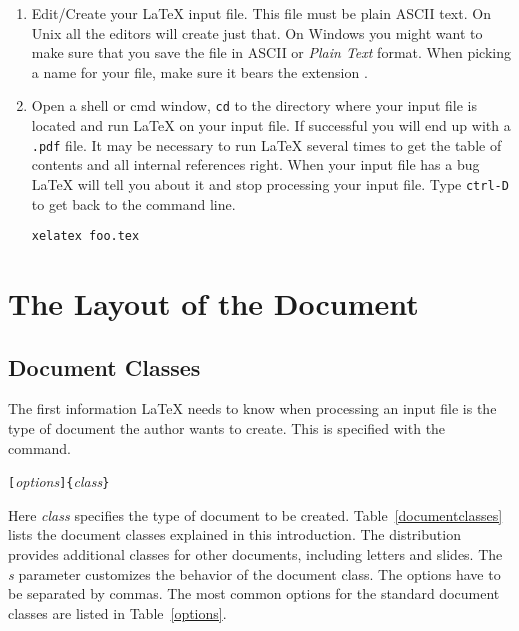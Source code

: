 \begin{enumerate}
\item

  Edit/Create your \LaTeX{} input file. This file must be plain ASCII
  text.  On Unix all the editors will create just that. On Windows you
  might want to make sure that you save the file in ASCII or
  \emph{Plain Text} format.  When picking a name for your file, make
  sure it bears the extension .

\item

Open a shell or cmd window, \texttt{cd} to the directory where your input file is located and run \LaTeX{} on your input file. If successful you will end up with a
\texttt{.pdf} file. It may be necessary to run \LaTeX{} several times to get
the table of contents and all internal references right. When your input
file has a bug \LaTeX{} will tell you about it and stop processing your
input file. Type \texttt{ctrl-D} to get back to the command line.
\begin{lscommand}
\verb+xelatex foo.tex+
\end{lscommand}

\end{enumerate}


\section{The Layout of the Document}

\subsection {Document Classes}\label{sec:documentclass}

The first information \LaTeX{} needs to know when processing an
input file is the type of document the author wants to create. This
is specified with the  command.
\begin{lscommand}
\verb|[|\emph{options}\verb|]{|\emph{class}\verb|}|
\end{lscommand}
\noindent Here \emph{class} specifies the type of document to be created.
Table~\ref{documentclasses} lists the document classes explained in
this introduction. The \LaTeXe{} distribution provides additional
classes for other documents, including letters and slides.  The
\emph{s} parameter customizes the behavior of the document
class. The options have to be separated by commas. The most common options for the standard document
classes are listed in
Table~\ref{options}.


